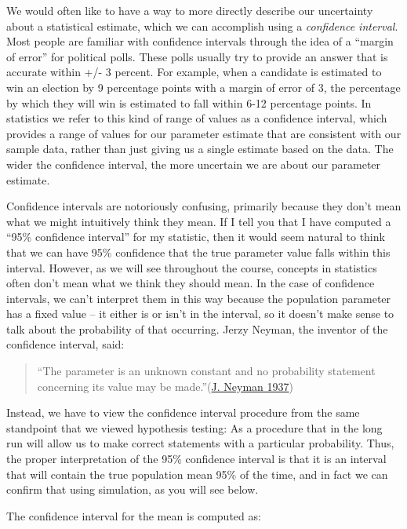 \documentclass[
  12pt,
]{book}
\begin{document}
We would often like to have a way to more directly describe our uncertainty about a statistical estimate, which we can accomplish using a \emph{confidence interval}. Most people are familiar with confidence intervals through the idea of a ``margin of error'' for political polls. These polls usually try to provide an answer that is accurate within +/- 3 percent. For example, when a candidate is estimated to win an election by 9 percentage points with a margin of error of 3, the percentage by which they will win is estimated to fall within 6-12 percentage points. In statistics we refer to this kind of range of values as a confidence interval, which provides a range of values for our parameter estimate that are consistent with our sample data, rather than just giving us a single estimate based on the data. The wider the confidence interval, the more uncertain we are about our parameter estimate.

Confidence intervals are notoriously confusing, primarily because they don't mean what we might intuitively think they mean. If I tell you that I have computed a ``95\% confidence interval'' for my statistic, then it would seem natural to think that we can have 95\% confidence that the true parameter value falls within this interval. However, as we will see throughout the course, concepts in statistics often don't mean what we think they should mean. In the case of confidence intervals, we can't interpret them in this way because the population parameter has a fixed value -- it either is or isn't in the interval, so it doesn't make sense to talk about the probability of that occurring. Jerzy Neyman, the inventor of the confidence interval, said:

\begin{quote}
``The parameter is an unknown constant and no probability statement concerning its value may be made.''(\protect\hyperlink{ref-Neyman37}{J. Neyman 1937})
\end{quote}

Instead, we have to view the confidence interval procedure from the same standpoint that we viewed hypothesis testing: As a procedure that in the long run will allow us to make correct statements with a particular probability. Thus, the proper interpretation of the 95\% confidence interval is that it is an interval that will contain the true population mean 95\% of the time, and in fact we can confirm that using simulation, as you will see below.

The confidence interval for the mean is computed as:
\end{document}
